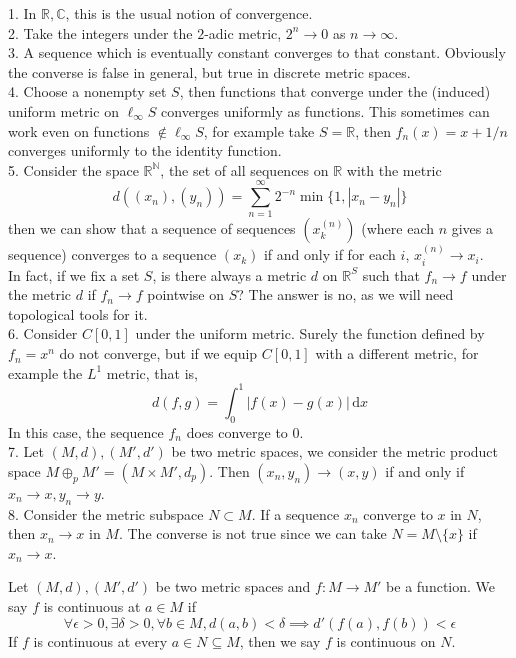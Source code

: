 \begin{example}
    1. In $\mathbb R, \mathbb C$, this is the usual notion of convergence.\\
    2. Take the integers under the $2$-adic metric, $2^n\to 0$ as $n\to\infty$.\\
    3. A sequence which is eventually constant converges to that constant.
    Obviously the converse is false in general, but true in discrete metric spaces.\\
    4. Choose a nonempty set $S$, then functions that converge under the (induced) uniform metric on $\ell_\infty S$ converges uniformly as functions.
    This sometimes can work even on functions $\notin\ell_\infty S$, for example take $S=\mathbb R$, then $f_n(x)=x+1/n$ converges uniformly to the identity function.\\
    5. Consider the space $\mathbb R^{\mathbb N}$, the set of all sequences on $\mathbb R$ with the metric
    $$d((x_n),(y_n))=\sum_{n=1}^\infty 2^{-n}\min{\{1, |x_n-y_n|\}}$$
    then we can show that a sequence of sequences $(x^{(n)}_k)$ (where each $n$ gives a sequence) converges to a sequence $(x_k)$ if and only if for each $i$, $x^(n)_i\to x_i$.\\
    In fact, if we fix a set $S$, is there always a metric $d$ on $\mathbb R^S$ such that $f_n\to f$ under the metric $d$ if $f_n\to f$ pointwise on $S$?
    The answer is no, as we will need topological tools for it.\\
    6. Consider $C[0,1]$ under the uniform metric.
    Surely the function defined by $f_n=x^n$ do not converge, but if we equip $C[0,1]$ with a different metric, for example the $L^1$ metric, that is,
    $$d(f,g)=\int_0^1|f(x)-g(x)|\,\mathrm dx$$
    In this case, the sequence $f_n$ does converge to $0$.\\
    7. Let $(M,d),(M',d')$ be two metric spaces, we consider the metric product space $M\oplus_pM'=(M\times M',d_p)$.
    Then $(x_n,y_n)\to (x,y)$ if and only if $x_n\to x,y_n\to y$.\\
    8. Consider the metric subspace $N\subset M$.
    If a sequence $x_n$ converge to $x$ in $N$, then $x_n\to x$ in $M$.
    The converse is not true since we can take $N=M\setminus\{x\}$ if $x_n\to x$.
\end{example}
\begin{definition}
    Let $(M,d),(M',d')$ be two metric spaces and $f:M\to M'$ be a function.
    We say $f$ is continuous at $a\in M$ if
    $$\forall\epsilon>0,\exists\delta>0,\forall b\in M,d(a,b)<\delta\implies d'(f(a),f(b))<\epsilon$$
    If $f$ is continuous at every $a\in N\subseteq M$, then we say $f$ is continuous on $N$.
\end{definition}
